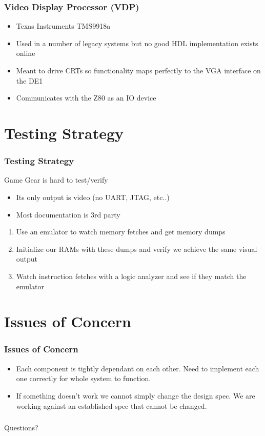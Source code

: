 \documentclass{beamer}
\newlength{\wideitemsep}
\let\olditem\item
\renewcommand{\item}{\setlength{\itemsep}{\wideitemsep}\olditem}
\begin{document}
\begin{frame}
    \frametitle{Video Display Processor (VDP)}

    \begin{itemize}
        \item<1-> Texas Instruments TMS9918a
        \item<2-> Used in a number of legacy systems but no good HDL implementation exists online
        \item<3-> Meant to drive CRTs so functionality maps perfectly to the VGA interface on the DE1
        \item<4-> Communicates with the Z80 as an IO device
    \end{itemize}
    \vspace{0.5cm}

\end{frame}

\section{Testing Strategy}
\begin{frame}
    \frametitle{Testing Strategy}
    Game Gear is hard to test/verify
    \begin{itemize}
            \olditem<2-> Its only output is video (no UART, JTAG, etc..)
            \olditem<3-> Most documentation is 3rd party
    \end{itemize}
    \vspace{0.25cm}
    \begin{enumerate}
        \olditem<5-> Use an emulator to watch memory fetches and get memory dumps
        \olditem<6-> Initialize our RAMs with these dumps and verify we achieve the same visual output
        \olditem<7-> Watch instruction fetches with a logic analyzer and see if they match the emulator
    \end{enumerate}
    \vspace{0.25cm}
\end{frame}

\section{Issues of Concern}
\begin{frame}
    \frametitle{Issues of Concern}
    \begin{itemize}
        \item Each component is tightly dependant on each other. Need to implement each one
        correctly for whole system to function.
        \item If something doesn't work we cannot simply change the design spec. We are working
            against an established spec that cannot be changed.
    \end{itemize}
\end{frame}

\begin{frame}
\frametitle{}
    \begin{center}
        \Huge
        Questions?
    \end{center}
\end{frame}
\end{document}
